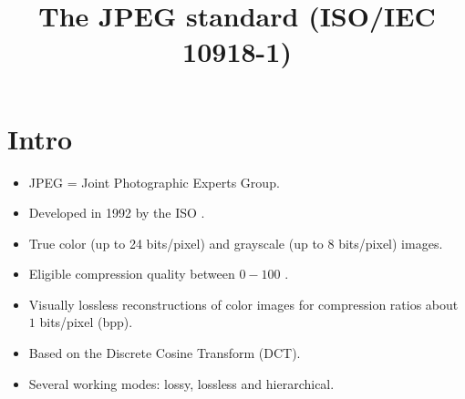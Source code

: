\title{The JPEG standard (ISO/IEC 10918-1)}
\maketitle
\tableofcontents

\section{Intro}
\begin{itemize}
\item JPEG = Joint Photographic Experts Group.
\item Developed in 1992 by the ISO \cite{CCITT.T81}.
\item True color (up to 24 bits/pixel) and grayscale (up to 8
  bits/pixel) images.
\item Eligible compression quality between $0-100$ \cite{Wallace91}.
\item Visually lossless reconstructions of color images for
  compression ratios about $1$ bits/pixel (bpp).
\item Based on the Discrete Cosine Transform (DCT).
\item Several working modes: lossy, lossless and hierarchical.
\end{itemize}

